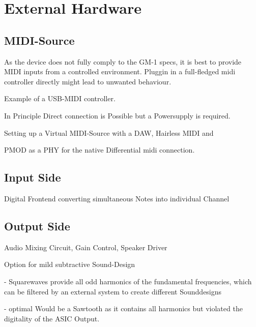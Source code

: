 \newpage
\section{External Hardware}

\subsection{MIDI-Source}

As the device does not fully comply to the GM-1 specs, it is best to provide MIDI inputs from a controlled environment. Pluggin in a full-fledged midi controller directly might lead to unwanted behaviour.

Example of a USB-MIDI controller. 

In Principle Direct connection is Possible but a Powersupply is required.

Setting up a Virtual MIDI-Source with a DAW, Hairless MIDI and 

PMOD as a PHY for the native Differential midi connection.

\subsection{Input Side}

Digital Frontend converting simultaneous Notes into individual Channel

\subsection{Output Side}\label{sec:external-output-circuitry}

Audio Mixing Circuit, Gain Control, Speaker Driver


Option for mild subtractive Sound-Design

- Squarewaves provide all odd harmonics of the fundamental frequencies, which can be filtered by an external system to create different Sounddesigns

- optimal Would be a Sawtooth as it contains all harmonics but violated the digitality of the ASIC Output. 
